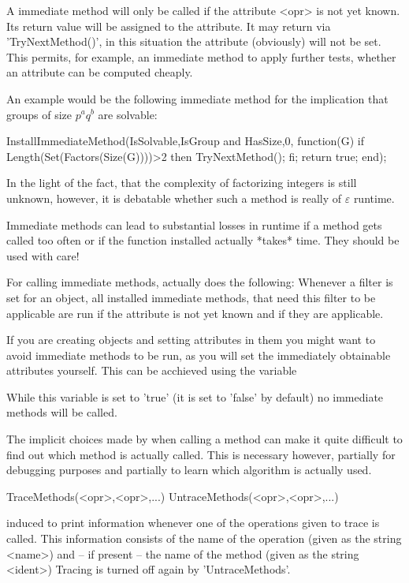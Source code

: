 A immediate method will only be called if the attribute <opr> is not yet
known. Its return value will be assigned to the attribute. It may return via
'TryNextMethod()', in this situation the attribute (obviously) will not be
set. This permits, for example, an immediate method to apply further tests,
whether an attribute can be computed cheaply.

An example would be the following immediate method for the implication that
groups of size $p^aq^b$ are solvable:

\beginexample
InstallImmediateMethod(IsSolvable,IsGroup and HasSize,0,
function(G)
  if Length(Set(Factors(Size(G))))>2 then
    TryNextMethod();
  fi;
  return true;
end);
\endexample

In the light of the fact, that the complexity of factorizing integers is
still unknown, however, it is debatable whether such a method is really of
$\varepsilon$ runtime.

Immediate methods can lead to substantial losses in runtime if a
method gets called too often or if the function installed actually *takes*
time. They should be used with care!

\danger
For calling immediate methods, {\GAP} actually does the following: 
Whenever a filter is set for an object, all installed immediate methods,
that need this filter to be applicable are run if the attribute is not yet
known and if they are applicable.

\danger
If you are creating objects and setting attributes in them you might want to
avoid immediate methods to be run, as you will set the immediately obtainable
attributes yourself. This can be acchieved using the variable


While this variable is set to 'true' (it is set to 'false' by default) no
immediate methods will be called.


The implicit choices made by {\GAP} when calling a method can make it quite
difficult to find out which method is actually called. This is necessary
however, partially for debugging purposes and partially to learn which
algorithm is actually used. 

\>TraceMethods(<opr>,<opr>,...)
\>UntraceMethods(<opr>,<opr>,...)

induced {\GAP} to print information whenever one of the operations given to
trace is called. This information consists of the name of the operation
(given as the string <name>) and -- if present -- the name of the method
(given as the string <ident>)
Tracing is turned off again by 'UntraceMethods'.

